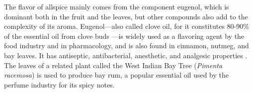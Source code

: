 The flavor of allspice mainly comes from the component eugenol, which is dominant both in the fruit and the leaves, but other compounds also add to the complexity of its aroma. Eugenol---also called clove oil, for it constitutes 80-90\% of the essential oil from clove buds \autocite[166]{barnes_herbal_2007}---is widely used as a flavoring agent by the food industry and in pharmacology, and is also found in cinnamon, nutmeg, and bay leaves. It has antiseptic, antibacterial, anesthetic, and analgesic properties \autocite{ulanowska_biological_2021}. The leaves of a related plant called the West Indian Bay Tree (\textit{Pimenta racemosa}) is used to produce bay rum, a popular essential oil used by the perfume industry for its spicy notes. 







